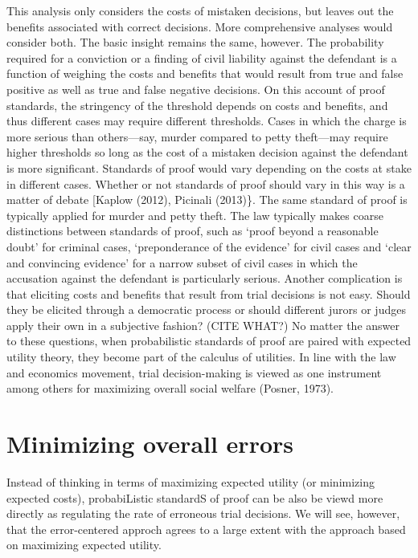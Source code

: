\documentclass[10pt,dvipsnames]{scrartcl}
\begin{document}
This analysis only considers the costs of mistaken decisions, but leaves
out the benefits associated with correct decisions. More comprehensive
analyses would consider both. The basic insight remains the same,
however. The probability required for a conviction or a finding of civil
liability against the defendant is a function of weighing the costs and
benefits that would result from true and false positive as well as true
and false negative decisions. On this account of proof standards, the
stringency of the threshold depends on costs and benefits, and thus
different cases may require different thresholds. Cases in which the
charge is more serious than others---say, murder compared to petty
theft---may require higher thresholds so long as the cost of a mistaken
decision against the defendant is more significant. Standards of proof
would vary depending on the costs at stake in different cases. Whether
or not standards of proof should vary in this way is a matter of debate
{[}Kaplow (2012), Picinali (2013)\}. The same standard of proof is
typically applied for murder and petty theft. The law typically makes
coarse distinctions between standards of proof, such as `proof beyond a
reasonable doubt' for criminal cases, `preponderance of the evidence'
for civil cases and `clear and convincing evidence' for a narrow subset
of civil cases in which the accusation against the defendant is
particularly serious. Another complication is that eliciting costs and
benefits that result from trial decisions is not easy. Should they be
elicited through a democratic process or should different jurors or
judges apply their own in a subjective fashion? (CITE WHAT?) No matter
the answer to these questions, when probabilistic standards of proof are
paired with expected utility theory, they become part of the calculus of
utilities. In line with the law and economics movement, trial
decision-making is viewed as one instrument among others for maximizing
overall social welfare (Posner, 1973).

\section{Minimizing overall errors}\label{minimizing-overall-errors}

Instead of thinking in terms of maximizing expected utility (or
minimizing expected costs), probabiListic standardS of proof can be also
be viewd more directly as regulating the rate of erroneous trial
decisions. We will see, however, that the error-centered approch agrees
to a large extent with the approach based on maximizing expected
utility.
\end{document}
